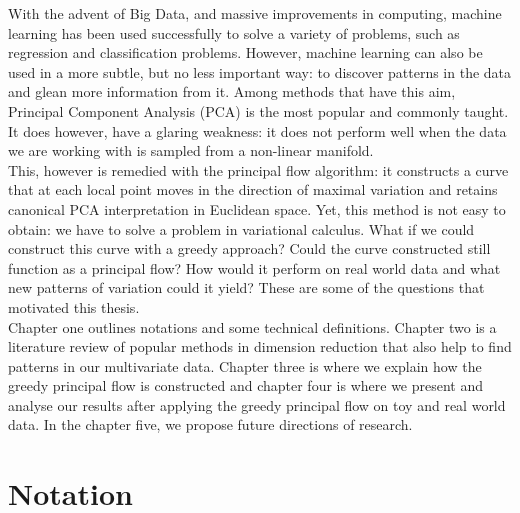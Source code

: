 \documentclass[12pt]{report}
\begin{document}
With the advent of Big Data, and massive improvements in computing,
machine learning has been used successfully to solve a variety of problems, 
such as regression and classification problems. However, machine learning
can also be used in a more subtle, but no less important way: to discover patterns
in the data and glean more information from it. Among methods that have this aim, 
Principal Component Analysis (PCA) is the most popular and 
commonly taught. It does however, have a glaring weakness: it does 
not perform well when the data we are working with is sampled from a non-linear manifold.
\\
This, however is remedied with the principal flow algorithm: 
it constructs a curve that at each local point moves in the direction of
maximal variation and retains canonical PCA interpretation in Euclidean space.
Yet, this method is not easy to obtain: we have to solve a problem in variational calculus. 
What if we could construct this curve with a greedy approach? 
Could the curve constructed still function as a principal flow? 
How would it perform on real world data and what new patterns of variation could it 
yield? These are some of the questions that motivated this thesis.\\
Chapter one outlines notations and some technical definitions. 
Chapter two is a literature review of popular methods in dimension reduction that 
also help to find patterns in our multivariate data. 
Chapter three is where we explain how the greedy principal flow is constructed and 
chapter four is where we present and analyse
our results after applying the greedy principal flow on toy and real world data.
In the chapter five, we propose future directions of research.

\newpage

\section{Notation}
\end{document}
